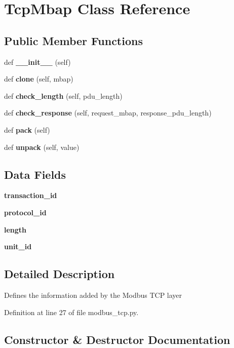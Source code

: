 \section{Tcp\+Mbap Class Reference}
\label{classmodbus__tk_1_1modbus__tcp_1_1_tcp_mbap}
\subsection*{Public Member Functions}
\begin{DoxyCompactItemize}
\item 
def {\bf \+\_\+\+\_\+init\+\_\+\+\_\+} (self)
\item 
def {\bf clone} (self, mbap)
\item 
def {\bf check\+\_\+length} (self, pdu\+\_\+length)
\item 
def {\bf check\+\_\+response} (self, request\+\_\+mbap, response\+\_\+pdu\+\_\+length)
\item 
def {\bf pack} (self)
\item 
def {\bf unpack} (self, value)
\end{DoxyCompactItemize}
\subsection*{Data Fields}
\begin{DoxyCompactItemize}
\item 
{\bf transaction\+\_\+id}
\item 
{\bf protocol\+\_\+id}
\item 
{\bf length}
\item 
{\bf unit\+\_\+id}
\end{DoxyCompactItemize}


\subsection{Detailed Description}
\begin{DoxyVerb}Defines the information added by the Modbus TCP layer\end{DoxyVerb}
 

Definition at line 27 of file modbus\+\_\+tcp.\+py.



\subsection{Constructor \& Destructor Documentation}
